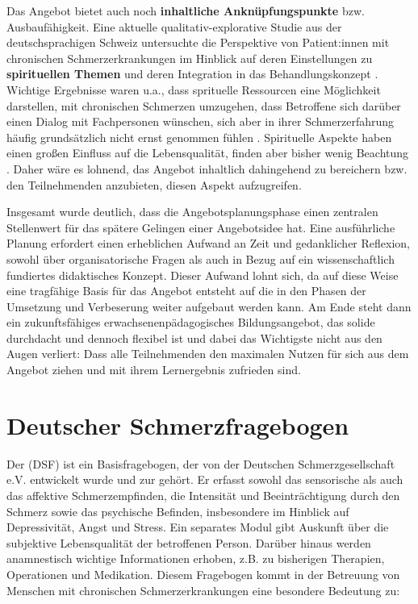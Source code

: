 \documentclass[
  twoside,
  parskip=half-,
]{scrreprt}
\begin{document}
Das Angebot bietet auch noch \textbf{inhaltliche Anknüpfungspunkte} bzw. Ausbaufähigkeit. Eine aktuelle qualitativ-explorative Studie aus der deutschsprachigen Schweiz untersuchte die Perspektive von Patient:innen mit chronischen Schmerzerkrankungen im Hinblick auf deren Einstellungen zu \textbf{spirituellen Themen} und deren Integration in das Behandlungskonzept \autocite[335]{HeftSchmerz5}. Wichtige Ergebnisse waren u.a., dass sprituelle Ressourcen eine Möglichkeit darstellen, mit chronischen Schmerzen umzugehen, dass Betroffene sich darüber einen Dialog mit Fachpersonen wünschen, sich aber in ihrer Schmerzerfahrung häufig grundsätzlich nicht ernst genommen fühlen \autocite[335]{HeftSchmerz5}. Spirituelle Aspekte haben einen großen Einfluss auf die Lebensqualität, finden aber bisher wenig Beachtung \autocite[vgl.][374]{fussnegger}. Daher wäre es lohnend, das Angebot inhaltlich dahingehend zu bereichern bzw. den Teilnehmenden anzubieten, diesen Aspekt aufzugreifen.

Insgesamt wurde deutlich, dass die Angebotsplanungsphase einen zentralen Stellenwert für das spätere Gelingen einer Angebotsidee hat. Eine ausführliche Planung erfordert einen erheblichen Aufwand an Zeit und gedanklicher Reflexion, sowohl über organisatorische Fragen als auch in Bezug auf ein wissenschaftlich fundiertes didaktisches Konzept. Dieser Aufwand lohnt sich, da auf diese Weise eine tragfähige Basis für das Angebot entsteht auf die in den Phasen der Umsetzung und Verbeserung weiter aufgebaut werden kann. Am Ende steht dann ein zukunftsfähiges erwachsenenpädagogisches Bildungsangebot, das solide durchdacht und dennoch flexibel ist und dabei das Wichtigste nicht aus den Augen verliert: Dass alle Teilnehmenden den maximalen Nutzen für sich aus dem Angebot ziehen und mit ihrem Lernergebnis zufrieden sind. 

\cleardoublepage
{}
\printbibliography[heading=bibintoc]

\cleardoublepage
{}



\listoffigures

\appendix
\chapter{Deutscher Schmerzfragebogen}

Der  (DSF) ist ein Basisfragebogen, der von der Deutschen Schmerzgesellschaft e.V. entwickelt wurde und zur  gehört. Er erfasst sowohl das sensorische als auch das affektive Schmerzempfinden, die Intensität und Beeinträchtigung durch den Schmerz sowie das psychische Befinden, insbesondere im Hinblick auf Depressivität, Angst und Stress. Ein separates Modul gibt Auskunft über die subjektive Lebensqualität der betroffenen Person. Darüber hinaus werden anamnestisch wichtige Informationen erhoben, z.B. zu bisherigen Therapien, Operationen und Medikation. Diesem Fragebogen kommt in der Betreuung von Menschen mit chronischen Schmerzerkrankungen eine besondere Bedeutung zu: 
\end{document}
